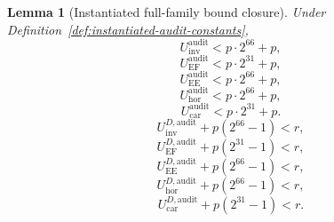 ﻿\documentclass[11pt]{article}
\newtheorem{lemma}[theorem]{Lemma}
\begin{document}
\begin{lemma}[Instantiated full-family bound closure]
\label{lem:instantiated-audit-closure}
Under Definition~\ref{def:instantiated-audit-constants},
\begin{equation}
U_{\mathrm{inv}}^{\mathrm{audit}} < p\cdot 2^{66}+p,
\label{eq:u-inv-inst-bound}
\end{equation}
\begin{equation}
U_{\mathrm{EF}}^{\mathrm{audit}} < p\cdot 2^{31}+p,
\label{eq:u-ef-inst-bound}
\end{equation}
\begin{equation}
U_{\mathrm{EE}}^{\mathrm{audit}} < p\cdot 2^{66}+p,
\label{eq:u-ee-inst-bound}
\end{equation}
\begin{equation}
U_{\mathrm{hor}}^{\mathrm{audit}} < p\cdot 2^{66}+p,
\label{eq:u-hor-inst-bound}
\end{equation}
\begin{equation}
U_{\mathrm{car}}^{\mathrm{audit}} < p\cdot 2^{31}+p.
\label{eq:u-car-inst-bound}
\end{equation}
\begin{equation}
U_{\mathrm{inv}}^{D,\mathrm{audit}} + p(2^{66}-1) < r,
\label{eq:u-inv-rhs-inst-bound}
\end{equation}
\begin{equation}
U_{\mathrm{EF}}^{D,\mathrm{audit}} + p(2^{31}-1) < r,
\label{eq:u-ef-rhs-inst-bound}
\end{equation}
\begin{equation}
U_{\mathrm{EE}}^{D,\mathrm{audit}} + p(2^{66}-1) < r,
\label{eq:u-ee-rhs-inst-bound}
\end{equation}
\begin{equation}
U_{\mathrm{hor}}^{D,\mathrm{audit}} + p(2^{66}-1) < r,
\label{eq:u-hor-rhs-inst-bound}
\end{equation}
\begin{equation}
U_{\mathrm{car}}^{D,\mathrm{audit}} + p(2^{31}-1) < r.
\label{eq:u-car-rhs-inst-bound}
\end{equation}
\end{lemma}
\end{document}
